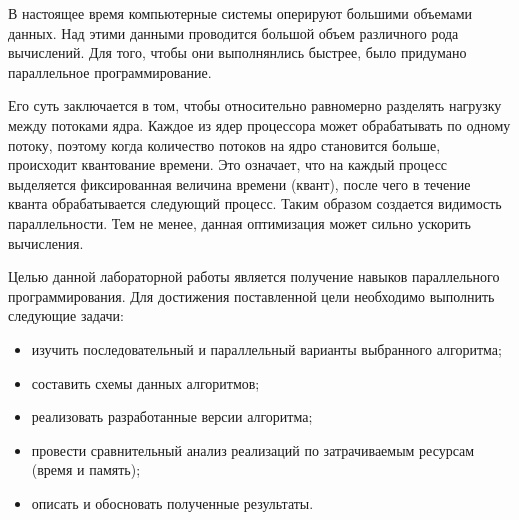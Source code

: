 \setcounter{page}{4}

В настоящее время компьютерные системы оперируют большими объемами данных. Над этими данными проводится большой объем различного рода вычислений. Для того, чтобы они выполнянлись быстрее, было придумано параллельное программирование.

Его суть заключается в том, чтобы относительно равномерно разделять нагрузку между потоками ядра. Каждое из ядер процессора может обрабатывать по одному потоку, поэтому когда количество потоков на ядро становится больше, происходит квантование времени. Это означает, что на каждый процесс выделяется фиксированная величина времени (квант), после чего в течение кванта обрабатывается следующий процесс. Таким образом создается видимость параллельности. Тем не менее, данная оптимизация может сильно ускорить вычисления. 

Целью данной лабораторной работы является получение навыков параллельного программирования. Для достижения поставленной цели необходимо выполнить следующие задачи:
\begin{itemize}
	\item изучить последовательный и параллельный варианты выбранного алгоритма;
	\item составить схемы данных алгоритмов;
	\item реализовать разработанные версии алгоритма;
	\item провести сравнительный анализ реализаций по затрачиваемым ресурсам (время и память);
	\item описать и обосновать полученные результаты.
\end{itemize}